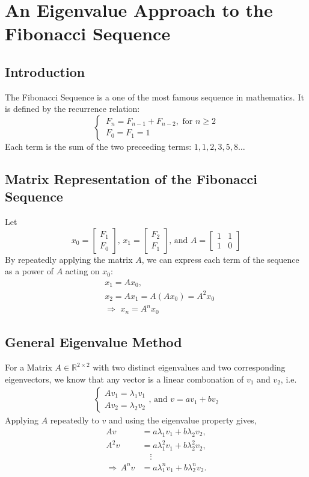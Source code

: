 \documentclass[11pt]{article}
\begin{document}
\begin{center}
    \tableofcontents
\end{center}
\setcounter{page}{1}
\newpage
\section{An Eigenvalue Approach to the Fibonacci Sequence}
\subsection{Introduction}
The Fibonacci Sequence is a one of the most famous sequence in mathematics. It is defined by the recurrence relation:
\[
    \begin{cases}
        \,F_n=F_{n-1}+F_{n-2},\text{ for }n \geq 2\\[.5em]
        \,F_0=F_1=1
    \end{cases}    
\]
Each term is the sum of the two preceeding terms: $1,1,2,3,5,8\dots$
\subsection{Matrix Representation of the Fibonacci Sequence}
Let 
\[
    x_0=\begin{bmatrix}
        F_1\\F_0
    \end{bmatrix}
    \text{, } x_1 =\begin{bmatrix}
        F_2\\F_1
    \end{bmatrix}
    \text{, and }A=\begin{bmatrix}
        1&1\\1&0
    \end{bmatrix}
\]
By repeatedly applying the matrix $A$, we can express each term of the sequence as a power of $A$ acting on $x_0$:
\begin{align*}
    &x_1 = A x_0, \\
    &x_2 = A x_1 = A (A x_0) = A^2 x_0\\
    &\Rightarrow \,\, x_n = A^nx_0
\end{align*}
\subsection{General Eigenvalue Method}
For a Matrix $A \in \mathbb{R}^{2\times 2}$ with two distinct eigenvalues and two corresponding eigenvectors, we know that any vector is a linear combonation of $v_1$ and $v_2$, i.e.
\begin{align*}
    \begin{cases}
        Av_1=\lambda_1 v_1\\
        Av_2=\lambda_2 v_2
    \end{cases}\text{, and }
    v=av_1+bv_2
\end{align*}
Applying $A$ repeatedly to $v$ and using the eigenvalue property gives, 
\begin{align*}
    Av &=a\lambda_1 v_1+b\lambda_2 v_2, \\
    A^2v &= a\lambda_1^2 v_1+b\lambda_2^2 v_2, \\
    &\quad\vdots \\
    \Rightarrow\, A^nv&=a\lambda_1^n v_1+b\lambda_2^n v_2.
\end{align*}
\end{document}

